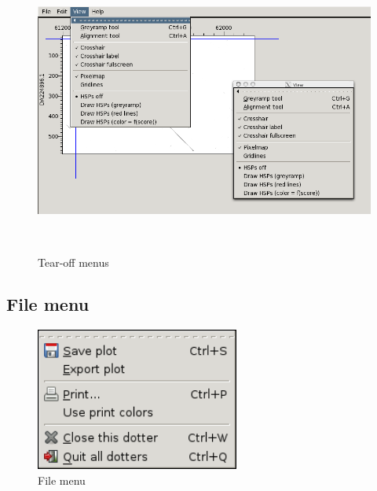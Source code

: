 \documentclass{report}
\begin{document}
\begin{figure}
 \centering
 \color[rgb]{0.30980393,0.5058824,0.7411765}
 \includegraphics[width=15.24cm,height=9.47cm]{img_menu_tear_off.png}
 \caption{Tear-off menus}
\end{figure}

\bigskip

{\color[rgb]{0.30980393,0.5058824,0.7411765}\subsection[File menu]{File menu}}

\begin{figure}
 \centering
 \color[rgb]{0.30980393,0.5058824,0.7411765}
 \includegraphics[width=6.69cm,height=4.685cm]{img_menu_file.png}
 \caption{File menu}
\end{figure}
\end{document}
